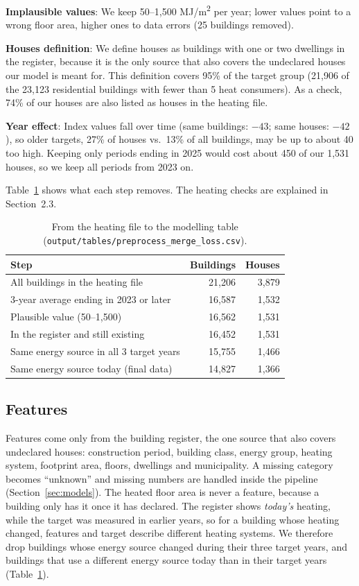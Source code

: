 \documentclass[11pt,a4paper]{article}
\begin{document}
\textbf{Implausible values}: We keep 50--1,500 MJ/m\textsuperscript{2} per year; lower values point to a
wrong floor area, higher ones to data errors (25 buildings removed).

\textbf{Houses definition}: We define houses as buildings with one or two dwellings in the register, because it is the only source that also covers the undeclared houses our model is meant for. This definition covers 95\% of the target group (21,906 of the 23,123 residential buildings with fewer than 5 heat consumers). As a check, 74\% of our houses are also listed as houses in the heating file.

\textbf{Year effect}: Index values fall over time (same buildings: $-43$; same houses: $-42$), so older targets, 27\% of houses vs.\ 13\% of all buildings, may be up to about 40 too high. Keeping only periods ending in 2025 would cost about 450 of our 1,531 houses, so we keep all periods from 2023 on.

Table~\ref{tab:mergeloss} shows what each step removes. The heating checks are explained in Section~2.3.

\begin{table}[ht]
\centering\small
\begin{tabular}{lrr}
\toprule
Step & Buildings & Houses \\
\midrule
All buildings in the heating file           & 21,206 & 3,879 \\
3-year average ending in 2023 or later      & 16,587 & 1,532 \\
Plausible value (50--1,500)                 & 16,562 & 1,531 \\
In the register and still existing          & 16,452 & 1,531 \\
Same energy source in all 3 target years    & 15,755 & 1,466 \\
Same energy source today (final data)       & 14,827 & 1,366 \\
\bottomrule
\end{tabular}
\caption{From the heating file to the modelling table (\texttt{output/tables/preprocess\_merge\_loss.csv}).}
\label{tab:mergeloss}
\end{table}


\subsection{Features}
Features come only from the building register, the one source that also covers
undeclared houses: construction period, building class, energy group, heating system,
footprint area, floors, dwellings and municipality. A missing category becomes ``unknown'' and missing numbers are handled inside the pipeline (Section~\ref{sec:models}). The heated
floor area is never a feature, because a building only has it once it has declared.
The register shows \emph{today's} heating, while the target was measured in earlier
years, so for a building whose heating changed, features and target describe different
heating systems. We therefore drop buildings whose energy source changed during their
three target years, and buildings that use a different energy source today than in
their target years (Table~\ref{tab:mergeloss}).
\end{document}
